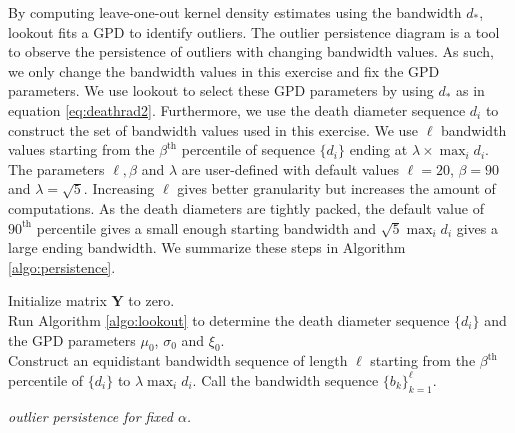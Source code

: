 \documentclass[11pt,a4paper,]{article}
\theoremstyle{definition}
\theoremstyle{definition}
\theoremstyle{definition}
\theoremstyle{remark}
\begin{document}
By computing leave-one-out kernel density estimates using the bandwidth \(d_*\), lookout fits a GPD to identify outliers. The outlier persistence diagram is a tool to observe the persistence of outliers with changing bandwidth values. As such, we only change the bandwidth values in this exercise and fix the GPD parameters. We use lookout to select these GPD parameters by using \(d_*\) as in equation \eqref{eq:deathrad2}. Furthermore, we use the death diameter sequence \(d_i\) to construct the set of bandwidth values used in this exercise. We use \(\ell\) bandwidth values starting from the \(\beta^{\text{th}}\) percentile of sequence \(\{d_i\}\) ending at \(\lambda \times \max_i{d_i}\). The parameters \(\ell, \beta\) and \(\lambda\) are user-defined with default values \(\ell = 20\), \(\beta= 90\) and \(\lambda = \sqrt{5}\). Increasing \(\ell\) gives better granularity but increases the amount of computations. As the death diameters are tightly packed, the default value of \(90^{\text{th}}\) percentile gives a small enough starting bandwidth and \(\sqrt{5} \max_i{d_i}\) gives a large ending bandwidth.
We summarize these steps in Algorithm \ref{algo:persistence}.

\DontPrintSemicolon
\begin{algorithm}\fontsize{11}{16}\selectfont
    Initialize matrix $\bm{Y}$ to zero. \\
    Run Algorithm \ref{algo:lookout} to determine the death diameter sequence $\{d_i\}$ and the GPD parameters $\mu_0$, $\sigma_0$ and $\xi_0$. \\
    Construct an equidistant bandwidth sequence of length $\ell$ starting from the $\beta^{\text{th}}$ percentile of $\{d_i\}$ to $ \lambda \max_i d_i$. Call the bandwidth sequence $\{b_k\}_{k=1}^{\ell}$. \\
    \caption{\itshape outlier persistence for fixed $\alpha$.}
    \label{algo:persistence}
\end{algorithm}
\end{document}
